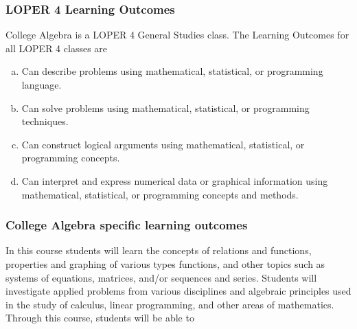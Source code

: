 \documentclass[12pt]{article}
\newcounter{on}\setcounter{on}{0}
\newcounter{ex}\setcounter{ex}{0}
\newenvironment{alphalist}{
  \begin{enumerate}[(a)]
    \addtolength{\itemsep}{-0.75\itemsep}}
  {\end{enumerate}}
\begin{document}
\subsubsection*{LOPER 4 Learning Outcomes}

College Algebra is a LOPER 4 General Studies class. The Learning Outcomes for
all  LOPER 4 classes are
\begin{alphalist}
\item Can describe problems using mathematical, statistical, or programming language.
\item Can solve problems using mathematical, statistical, or programming techniques.
\item Can construct logical arguments using mathematical, statistical, or programming concepts.
\item Can interpret and express numerical data or graphical information using 
   mathematical, statistical, or programming concepts and methods.
\end{alphalist}


\subsubsection*{College Algebra specific learning outcomes} 

In this course students will learn the concepts of relations and 
functions, properties and graphing of various types functions, and other topics such 
as systems of equations, matrices, and/or sequences and series. Students will 
investigate applied problems from various disciplines and 
algebraic principles used in the study of calculus, linear programming, and other 
areas of mathematics. Through this course, students will be able to
\end{document}
